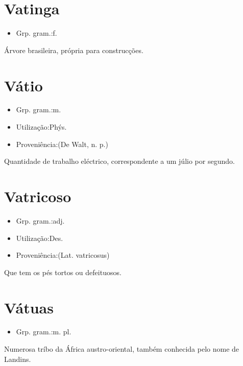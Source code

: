 \documentclass{article}
\begin{document}
\section{Vatinga}
\begin{itemize}
\item {Grp. gram.:f.}
\end{itemize}
Árvore brasileira, própria para construcções.
\section{Vátio}
\begin{itemize}
\item {Grp. gram.:m.}
\end{itemize}
\begin{itemize}
\item {Utilização:Phýs.}
\end{itemize}
\begin{itemize}
\item {Proveniência:(De \textunderscore Walt\textunderscore , n. p.)}
\end{itemize}
Quantidade de trabalho eléctrico, correspondente a um júlio por segundo.
\section{Vatricoso}
\begin{itemize}
\item {Grp. gram.:adj.}
\end{itemize}
\begin{itemize}
\item {Utilização:Des.}
\end{itemize}
\begin{itemize}
\item {Proveniência:(Lat. \textunderscore vatricosus\textunderscore )}
\end{itemize}
Que tem os pés tortos ou defeituosos.
\section{Vátuas}
\begin{itemize}
\item {Grp. gram.:m. pl.}
\end{itemize}
Numerosa tríbo da África austro-oriental, também conhecida pelo nome de \textunderscore Landins\textunderscore .
\end{document}
